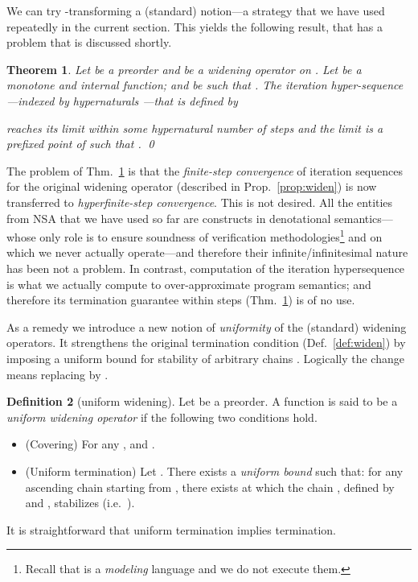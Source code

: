 \documentclass[envcountsect,orivec]{llncs} \pdfoutput=1
\newtheorem{mythm}{Theorem}[section]
\theoremstyle{definition}
\newtheorem{mydef}[mythm]{Definition}
\def\myqed{\qed}
\begin{document}
We can try -transforming a (standard) notion---a strategy that we have used repeatedly in the current section. This
yields the following result, that has a problem that is discussed shortly.
\begin{mythm}
\label{thm:widenwithinf}
Let  be a preorder and  be a widening operator on .
Let  
be a monotone and internal function;
and  
be such that .
 The  iteration \emph{hyper}-sequence 
---indexed by hypernaturals
 ---that is defined by
 
reaches its limit within some hypernatural number of steps and the limit
  is a prefixed point of  such that . \myqed
\end{mythm}
The problem of Thm.~\ref{thm:widenwithinf} is that the \emph{finite-step
 convergence} of iteration sequences for the original widening operator (described in Prop.~\ref{prop:widen})
 is now transferred to \emph{hyper\-finite-step convergence}. 
 This is not desired. All the entities from NSA that we have used so far
 are constructs in denotational semantics---whose only role is to ensure
 soundness of verification methodologies\footnote{Recall that 
 is a \emph{modeling} language and we do not execute them.} and on which
 we never actually operate---and therefore their
 infinite/infinitesimal nature has been not a problem. In contrast,
 computation of the iteration hypersequence  is what we actually compute to
 over-approximate program semantics; and therefore its termination
 guarantee within  steps (Thm.~\ref{thm:widenwithinf})
 is of no use.
 
 As a remedy we introduce a new notion of \emph{uniformity} of the (standard) widening
 operators. It strengthens the original termination condition
 (Def.~\ref{def:widen})
 by imposing a uniform bound  for stability of arbitrary chains
 . Logically the change means
 replacing  by .

\begin{mydef}[uniform widening]\label{def:unifwiden}
 Let  be a preorder.
 A function  is said to be a \emph{uniform widening operator} if the following two conditions hold.
 \begin{itemize}
  \item (Covering) For any ,  and .
  \item (Uniform termination) Let . There exists a
	\emph{uniform bound}  such that: for any ascending
	chain  starting from , there
	exists  at which the chain  , defined by  and , stabilizes (i.e.\ ). 
\end{itemize}
\end{mydef}
It is straightforward that uniform termination implies termination.
\end{document}
